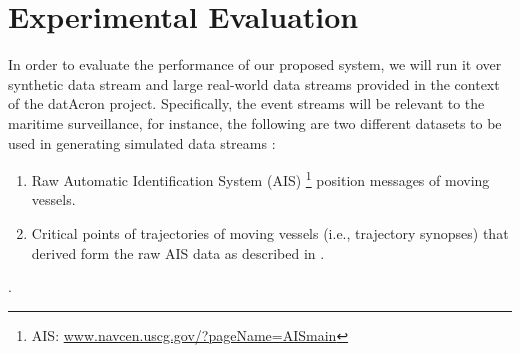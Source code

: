 
\section{Experimental Evaluation}

\par In order to evaluate the performance of our proposed system, we will run it over synthetic data stream and large real-world data streams provided in the context of the datAcron project. Specifically, the event streams will be relevant to the maritime surveillance, for instance, the following are two different datasets to be used in generating simulated data streams : \begin{enumerate} 
	\item Raw Automatic Identification System (AIS) \footnote{AIS: \url{www.navcen.uscg.gov/?pageName=AISmain}} position messages of moving vessels.
	\item Critical points of trajectories of moving vessels (i.e., trajectory synopses) that derived form the raw AIS data as described in \citep{synopses1}.
\end{enumerate}




 .